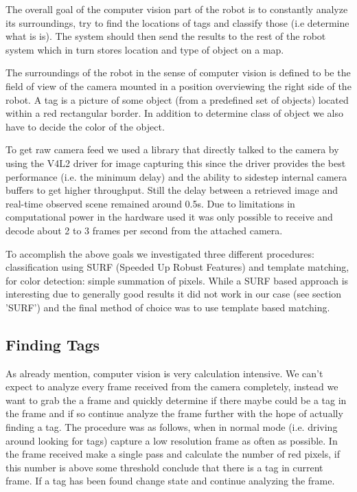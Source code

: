 The overall goal of the computer vision part of the robot is to constantly analyze its surroundings, try to find the locations of tags and classify those (i.e determine what is is). The system should then send the results to the rest of the robot system which in turn stores location and type of object on a map.

The surroundings of the robot in the sense of computer vision is defined to be the field of view of the camera mounted in a position overviewing the right side of the robot. A tag is a picture of some object (from a predefined set of objects) located within a red rectangular border. In addition to determine class of object we also have to decide the color of the object.

To get raw camera feed we used a library that directly talked to the camera by using the V4L2 driver for image capturing this since the driver provides the best performance (i.e. the minimum delay) and the ability to sidestep internal camera buffers to get higher throughput. Still the delay between a retrieved image and real-time observed scene remained around 0.5s. Due to limitations in computational power in the hardware used it was only possible to receive and decode about 2 to 3 frames per second from the attached camera.

To accomplish the above goals we investigated three different procedures: classification using SURF (Speeded Up Robust Features) and template matching, for color detection: simple summation of pixels. While a SURF based approach is interesting due to generally good results it did not work in our case (see section 'SURF') and the final method of choice was to use template based matching.

\subsection{Finding Tags}
As already mention, computer vision is very calculation intensive. We can't expect to analyze every frame received from the camera completely, instead we want to grab the a frame and quickly determine if there maybe could be a tag in the frame and if so continue analyze the frame further with the hope of actually finding a tag. The procedure was as follows, when in normal mode (i.e. driving around looking for tags) capture a low resolution frame as often as possible. In the frame received make a single pass and calculate the number of red pixels, if this number is above some threshold conclude that there is a tag in current frame. If a tag has been found change state and continue analyzing the frame.

